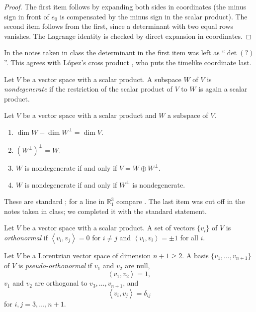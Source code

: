 \begin{proof}
The first item follows by expanding both
sides in coordinates (the minus sign in
front of $e_0$ is compensated by the minus
sign in the scalar product). The second
item follows from the first, since a
determinant with two equal rows vanishes.
The Lagrange identity is checked by direct
expansion in coordinates.
\end{proof}

In the notes taken in class the
determinant in the first item was left as
``$\det(?)$''. This agrees with López's
cross product \cite[Section
1.2]{lopez2014differential}, who puts the
timelike coordinate last.

\begin{definition}
\label{definition-palmas-nondeg-subspace}
Let $V$ be a vector space with a scalar
product. A subspace $W$ of $V$ is
\emph{nondegenerate} if the restriction of
the scalar product of $V$ to $W$ is again a
scalar product.
\end{definition}

\begin{proposition}[Subspaces]
\label{proposition-palmas-subspaces}
Let $V$ be a vector space with a scalar
product and $W$ a subspace of $V$.
\begin{enumerate}
\item $\dim W+\dim W^{\perp}=\dim V$.
\item $(W^{\perp})^{\perp}=W$.
\item $W$ is nondegenerate if and only if
$V=W\oplus W^{\perp}$.
\item $W$ is nondegenerate if and only if
$W^{\perp}$ is nondegenerate.
\end{enumerate}
\end{proposition}

These are standard \cite{oneill}; for a
line in $\mathbb{R}^3_1$ compare
\cite[Proposition 1.1]{%
lopez2014differential}.
The last item was cut off in the notes
taken in class; we completed it with the
standard statement.

\begin{definition}
\label{definition-palmas-orthonormal-set}
Let $V$ be a vector space with a scalar
product. A set of vectors $\{v_i\}$ of $V$
is \emph{orthonormal} if
$\left\langle{} v_i,v_j \right\rangle{}=0$
for $i\neq j$ and
$\left\langle{} v_i,v_i \right\rangle{}
=\pm 1$ for all $i$.
\end{definition}

\begin{definition}
\label{definition-palmas-pseudo-orthonormal}
Let $V$ be a Lorentzian vector space of
dimension $n+1\geq 2$. A basis
$\{v_1,\dots,v_{n+1}\}$ of $V$ is
\emph{pseudo-orthonormal} if
$v_1$ and $v_2$ are null,
$$
\left\langle{} v_1,v_2 \right\rangle{}=1,
$$
$v_1$ and $v_2$ are orthogonal to
$v_3,\dots,v_{n+1}$, and
$$
\left\langle{} v_i,v_j \right\rangle{}
=\delta_{ij}
$$
for $i,j=3,\dots,n+1$.
\end{definition}

